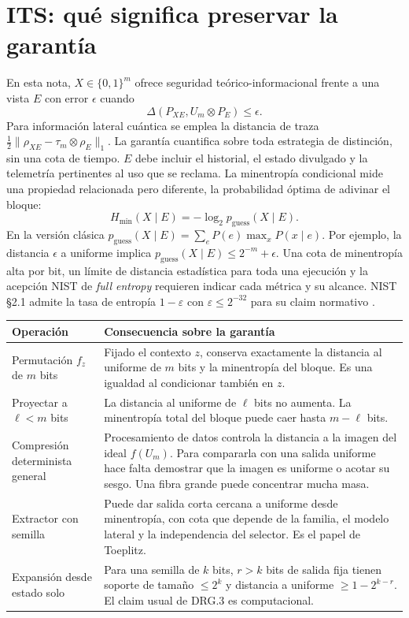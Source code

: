 \documentclass[11pt,a4paper]{article}
\newcommand{\bits}{\{0,1\}}
\newcommand{\hm}{H_{\min}}
\newcommand{\dist}{\Delta}
\newcommand{\pg}{p_{\mathrm{guess}}}
\begin{document}
\section{ITS: qué significa preservar la garantía}
\label{sec:its-principles}
En esta nota, \(X\in\bits^m\) ofrece seguridad
teórico-informacional frente a una vista \(E\) con error
\(\epsilon\) cuando
\[
 \dist(P_{XE},U_m\otimes P_E)\le\epsilon.
\]
Para información lateral cuántica se emplea la distancia
de traza \(\tfrac12\|\rho_{XE}-\tau_m\otimes\rho_E\|_1\).
La garantía cuantifica sobre toda estrategia de distinción,
sin una cota de tiempo. \(E\) debe incluir el historial,
el estado divulgado y la telemetría pertinentes al uso
que se reclama. La minentropía condicional mide una
propiedad relacionada pero diferente, la probabilidad
óptima de adivinar el bloque:
\[
      \hm(X\mid E)=-\log_2\pg(X\mid E).
\]
En la versión clásica
\(\pg(X\mid E)=\sum_e P(e)\max_x P(x\mid e)\).
Por ejemplo, la distancia \(\epsilon\) a uniforme implica
\(\pg(X\mid E)\le 2^{-m}+\epsilon\).
Una cota de minentropía alta por bit, un límite de
distancia estadística para toda una ejecución y la
acepción NIST de \emph{full entropy} requieren indicar
cada métrica y su alcance. NIST §2.1 admite la tasa
de entropía \(1-\varepsilon\) con
\(\varepsilon\le2^{-32}\) para su claim normativo
\cite[§2.1]{nist90c}\cite{lhl}.

\begin{center}
\small
\begin{tabularx}{\linewidth}{@{}lY@{}}
\toprule
Operación & Consecuencia sobre la garantía \\
\midrule
Permutación \(f_z\) de \(m\) bits &
Fijado el contexto \(z\), conserva exactamente la distancia
al uniforme de \(m\) bits y la minentropía del bloque.
Es una igualdad al condicionar también en \(z\). \\
Proyectar a \(\ell<m\) bits &
La distancia al uniforme de \(\ell\) bits no aumenta.
La minentropía total del bloque puede caer hasta \(m-\ell\) bits. \\
Compresión determinista general &
Procesamiento de datos controla la distancia a la imagen del
ideal \(f(U_m)\). Para compararla con una salida uniforme
hace falta demostrar que la imagen es uniforme o acotar su
sesgo. Una fibra grande puede concentrar mucha masa. \\
Extractor con semilla &
Puede dar salida corta cercana a uniforme desde minentropía,
con cota que depende de la familia, el modelo lateral y
la independencia del selector. Es el papel de Toeplitz. \\
Expansión desde estado solo &
Para una semilla de \(k\) bits, \(r>k\) bits de salida fija
tienen soporte de tamaño \(\le2^k\) y distancia a uniforme
\(\ge1-2^{k-r}\). El claim usual de DRG.3 es computacional. \\
\bottomrule
\end{tabularx}
\end{center}
\end{document}
